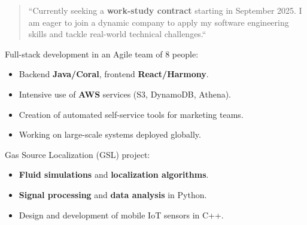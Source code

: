\documentclass[10pt,a4paper,ragged2e,withhyper]{../AltaCV/altacv}
\begin{document}



\makecvheader


\begin{paracol}{2}

  \begin{quote}
    \normalsize
    ``Currently seeking a \textbf{work-study contract} starting in September 2025.
    I am eager to join a dynamic company to apply my software engineering skills and tackle real-world technical challenges.``
  \end{quote}


  Full-stack development in an Agile team of 8 people:

  \begin{itemize}
    \item Backend \textbf{Java/Coral}, frontend \textbf{React/Harmony}.
    \item Intensive use of \textbf{AWS} services (S3, DynamoDB, Athena).
    \item Creation of automated self-service tools for marketing teams.
    \item Working on large-scale systems deployed globally.
  \end{itemize}

  \divider

  Gas Source Localization (GSL) project:
  \begin{itemize}
    \item \textbf{Fluid simulations} and \textbf{localization algorithms}.
    \item \textbf{Signal processing} and \textbf{data analysis} in Python.
    \item Design and development of mobile IoT sensors in C++.
  \end{itemize}


\end{paracol}
\end{document}
